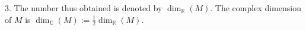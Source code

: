 3. The number thus obtained is denoted by $\dim_{\mathbb{R}}(M)$. The complex dimension of $M$ is $\dim_{\mathbb{C}}(M) := \frac{1}{2} \dim_{\mathbb{R}}(M)$.
